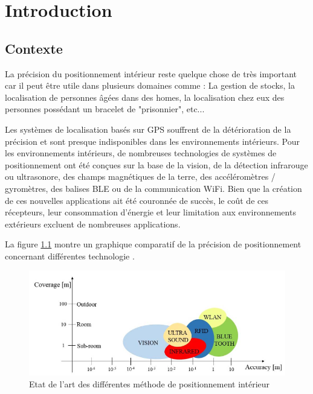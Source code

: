 \chapter{Introduction}

\section{Contexte}
La précision du positionnement intérieur reste quelque chose de très important car il peut être utile dans plusieurs domaines comme : La gestion de stocks, la localisation de personnes âgées dans des homes, la localisation chez eux des personnes possédant un bracelet de "prisonnier", etc...

Les systèmes de localisation basés sur GPS souffrent de la détérioration de la précision et sont presque indisponibles dans les environnements intérieurs. Pour les environnements intérieurs, de nombreuses technologies de systèmes de positionnement ont été conçues sur la base de la vision, de la détection infrarouge ou ultrasonore, des champs magnétiques de la terre, des accéléromètres / gyromètres, des balises BLE ou de la communication WiFi. Bien que la création de ces nouvelles applications ait été couronnée de succès, le coût de ces récepteurs, leur consommation d’énergie et leur limitation aux environnements extérieurs excluent de nombreuses applications.

La figure \ref{fig:MethodePos} montre un graphique comparatif de la précision de positionnement concernant différentes technologie \cite{INPOS}. 

\begin{figure}[H]
	\begin{center}
		\includegraphics[scale=0.7]{figures/MethodePos.png}
		\caption{Etat de l'art des différentes méthode de positionnement intérieur \cite{INPOS}}
		\label{fig:MethodePos} %
	\end{center}
\end{figure}

